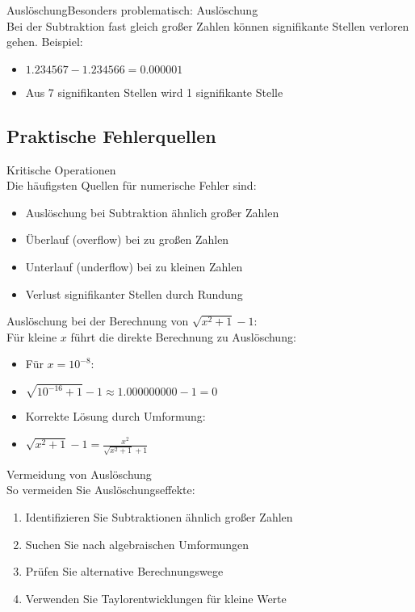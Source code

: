 \begin{remark2}{Auslöschung}Besonders problematisch: Auslöschung\\
Bei der Subtraktion fast gleich großer Zahlen können signifikante Stellen verloren gehen. Beispiel:
\begin{itemize}
    \item $1.234567 - 1.234566 = 0.000001$
    \item Aus 7 signifikanten Stellen wird 1 signifikante Stelle
\end{itemize}
\end{remark2}

\subsection{Praktische Fehlerquellen}

\begin{concept}{Kritische Operationen}\\
Die häufigsten Quellen für numerische Fehler sind:
\begin{itemize}
    \item Auslöschung bei Subtraktion ähnlich großer Zahlen
    \item Überlauf (overflow) bei zu großen Zahlen
    \item Unterlauf (underflow) bei zu kleinen Zahlen
    \item Verlust signifikanter Stellen durch Rundung
\end{itemize}
\end{concept}

\begin{example2}{Auslöschung} bei der Berechnung von $\sqrt{x^2 + 1} - 1$:\\
Für kleine $x$ führt die direkte Berechnung zu Auslöschung:
\begin{itemize}
    \item Für $x = 10^{-8}$:
    \item $\sqrt{10^{-16} + 1} - 1 \approx 1.000000000 - 1 = 0$
    \item Korrekte Lösung durch Umformung:
    \item $\sqrt{x^2 + 1} - 1 = \frac{x^2}{\sqrt{x^2 + 1} + 1}$
\end{itemize}
\end{example2}

\begin{KR}{Vermeidung von Auslöschung}\\
So vermeiden Sie Auslöschungseffekte:
\begin{enumerate}
    \item Identifizieren Sie Subtraktionen ähnlich großer Zahlen
    \item Suchen Sie nach algebraischen Umformungen
    \item Prüfen Sie alternative Berechnungswege
    \item Verwenden Sie Taylorentwicklungen für kleine Werte
\end{enumerate}
\end{KR}

